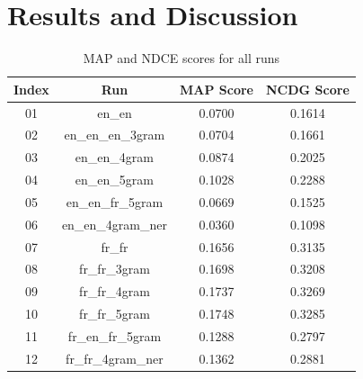 \section{Results and Discussion}
\label{sec:results}

\begin{table}
    \begin{center}
        \caption{MAP and NDCE scores for all runs}
        \label{tab:all_scores}
        \begin{tabular}{|c|c||c|c|} 
            \hline
            \textbf{Index} & \textbf{Run} & \textbf{MAP Score} & \textbf{NCDG Score}\\
            \hline\hline
            01 & en\_en & \cellcolor{red!30!white}0.0700 & \cellcolor{red!30!white}0.1614 \\
            \hline
            02 & en\_en\_en\_3gram & 0.0704 & 0.1661 \\
            \hline
            03 & en\_en\_4gram & 0.0874 & 0.2025 \\
            \hline
            04 & en\_en\_5gram & 0.1028 & 0.2288 \\
            \hline
            05 & en\_en\_fr\_5gram & \cellcolor{red!60!white}0.0669 & \cellcolor{red!60!white}0.1525 \\
            \hline
            06 & en\_en\_4gram\_ner & \cellcolor{red}0.0360 & \cellcolor{red}0.1098 \\
            \hline
            07 & fr\_fr & 0.1656 & 0.3135 \\
            \hline
            08 & fr\_fr\_3gram & \cellcolor{green!30!white}0.1698 & \cellcolor{green!30!white}0.3208 \\
            \hline
            09 & fr\_fr\_4gram & \cellcolor{green!60!white}0.1737 & \cellcolor{green!60!white}0.3269 \\
            \hline
            10 & fr\_fr\_5gram & \cellcolor{green}0.1748 & \cellcolor{green}0.3285 \\
            \hline
            11 & fr\_en\_fr\_5gram & 0.1288 & 0.2797 \\
            \hline
            12 & fr\_fr\_4gram\_ner & 0.1362 & 0.2881 \\
            \hline
        \end{tabular}
    \end{center}
\end{table}

